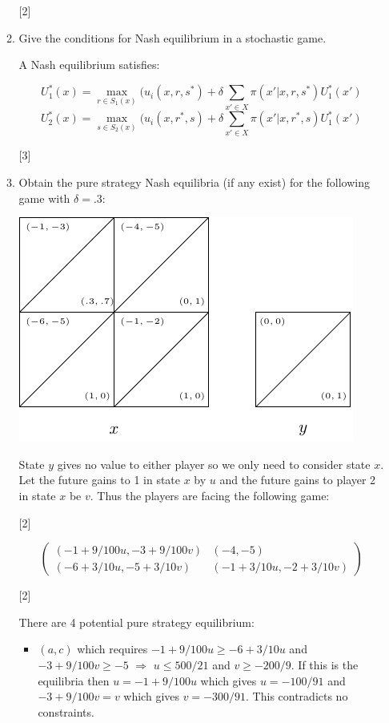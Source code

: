 \documentclass[12pt,a4paper]{article}
\begin{document}
\begin{enumerate}
\begin{enumerate}
        \hfill[2]

        \item Give the conditions for Nash equilibrium in a stochastic game.

            A Nash equilibrium satisfies:

            $$U_1^*(x)=\max_{r\in S_1(x)}(u_i(x,r,s^*)+\delta\sum_{x'\in X}\pi(x'|x,r,s^*)U_1^*(x')$$
            $$U_2^*(x)=\max_{s\in S_2(x)}(u_i(x,r^*,s)+\delta\sum_{x'\in X}\pi(x'|x,r^*,s)U_1^*(x')$$

        \hfill[3]

        \item Obtain the pure strategy Nash equilibria (if any exist) for the
            following game with \(\delta=.3\):

        \begin{center}
            \includegraphics[width=.8\textwidth]{images/2014-2015-resit-img01.pdf}
        \end{center}

        State \(y\) gives no value to either player so we only need to consider state \(x\). Let the future gains to 1 in state \(x\) by \(u\) and the future gains to player 2 in state \(x\) be \(v\). Thus the players are facing the following game:

        \hfill[2]

        \[\begin{pmatrix}
        (-1+9/100u,-3+9/100v)&(-4,-5)\\
        (-6+3/10u,-5+3/10v)&(-1+3/10u,-2+3/10v)
        \end{pmatrix}\]

        \hfill[2]

        There are 4 potential pure strategy equilibrium:

        \begin{itemize}
            \item \((a,c)\) which requires \(-1+9/100u\geq -6+3/10u\) and
                \(-3+9/100v\geq -5\) \(\Rightarrow\) \(u\leq 500/21\) and
                \(v\geq -200/9\). If this is the equilibria then \(u=-1+9/100u\)
                which gives \(u=-100/91\) and \(-3+9/100v=v\) which gives
                \(v=-300/91\). This contradicts no constraints.


\end{itemize}
\end{enumerate}
\end{enumerate}
\end{document}
